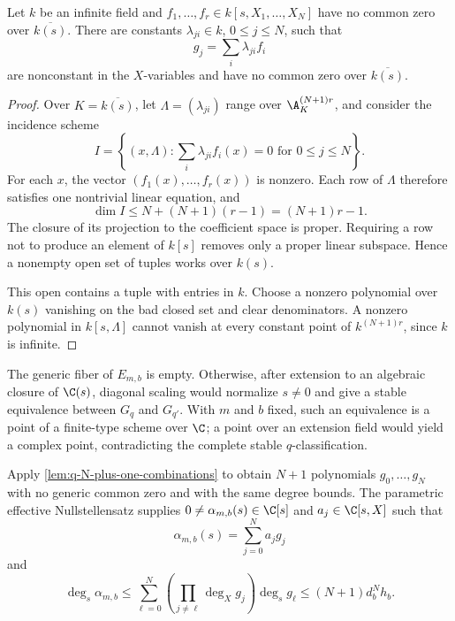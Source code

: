 \begin{lemma}
\label{lem:q-N-plus-one-combinations}
Let \(k\) be an infinite field and
\(f_1,\ldots,f_r\in k[s,X_1,\ldots,X_N]\) have no common zero over
\(\overline{k(s)}\).  There are constants \(\lambda_{ji}\in k\),
\(0\le j\le N\), such that
\[
 g_j=\sum_i\lambda_{ji}f_i
\]
are nonconstant in the \(X\)-variables and have no common zero over
\(\overline{k(s)}\).
\end{lemma}

\begin{proof}
Over \(K=\overline{k(s)}\), let \(\Lambda=(\lambda_{ji})\) range over
\(\A_K^{(N+1)r}\), and consider the incidence scheme
\[
 I=\left\{(x,\Lambda):
 \sum_i\lambda_{ji}f_i(x)=0\text{ for }0\le j\le N\right\}.
\]
For each \(x\), the vector \((f_1(x),\ldots,f_r(x))\) is nonzero.  Each row
of \(\Lambda\) therefore satisfies one nontrivial linear equation, and
\[
 \dim I\le N+(N+1)(r-1)=(N+1)r-1.
\]
The closure of its projection to the coefficient space is proper.  Requiring
a row not to produce an element of \(k[s]\) removes only a proper linear
subspace.  Hence a nonempty open set of tuples works over \(k(s)\).

This open contains a tuple with entries in \(k\).  Choose a nonzero polynomial
over \(k(s)\) vanishing on the bad closed set and clear denominators.  A
nonzero polynomial in \(k[s,\Lambda]\) cannot vanish at every constant point
of \(k^{(N+1)r}\), since \(k\) is infinite.
\end{proof}

The generic fiber of \(E_{m,b}\) is empty.  Otherwise, after extension to an
algebraic closure of \(\C(s)\), diagonal scaling would normalize \(s\ne0\)
and give a stable equivalence between \(G_q\) and \(G_{q'}\).  With \(m\)
and \(b\) fixed, such an equivalence is a point of a finite-type scheme over
\(\C\); a point over an extension field would yield a complex point,
contradicting the complete stable \(q\)-classification.

Apply \cref{lem:q-N-plus-one-combinations} to obtain \(N+1\) polynomials
\(g_0,\ldots,g_N\) with no generic common zero and with the same degree
bounds.  The parametric effective Nullstellensatz
\cite[Theorem~0.5]{dAndreaKrickSombra2013} supplies
\(0\ne\alpha_{m,b}(s)\in\C[s]\) and \(a_j\in\C[s,X]\) such that
\[
 \alpha_{m,b}(s)=\sum_{j=0}^{N}a_jg_j
\]
and
\[
 \deg_s\alpha_{m,b}
 \le\sum_{\ell=0}^{N}
 \left(\prod_{j\ne\ell}\deg_Xg_j\right)\deg_sg_\ell
 \le (N+1)d_b^Nh_b.
\]

